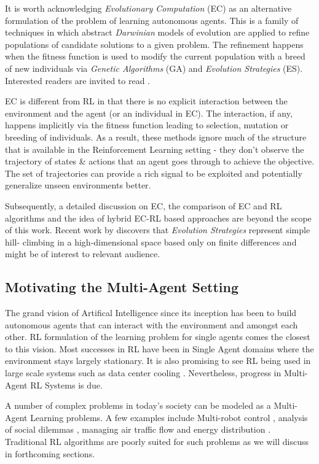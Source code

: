 \documentclass[12pt,a4paper]{article}
\begin{document}
It is worth acknowledging \textit{Evolutionary Computation} (EC) as an alternative formulation
of the problem of learning autonomous agents. This is a family of techniques in which abstract
\textit{Darwinian} models of evolution are applied to refine populations of candidate solutions to
a given problem. The refinement happens when the fitness function is used to modify the
current population with a breed of new individuals via \textit{Genetic Algorithms} (GA) and
\textit{Evolution Strategies} (ES). Interested readers are invited to read \cite{DeJong:2002:EC:1137808}.

EC is different from RL in that there is no explicit interaction between the environment and the
agent (or an individual in EC). The interaction, if any, happens implicitly via the fitness function
leading to selection, mutation or breeding of individuals. As a result, these methods ignore
much of the structure that is available in the Reinforcement Learning setting - they don't
observe the trajectory of states \& actions that an agent goes through to achieve the objective.
The set of trajectories can provide a rich signal to be exploited and potentially generalize 
unseen environments better.

Subsequently, a detailed discussion on EC, the comparison of EC and RL algorithms and the 
idea of hybrid EC-RL based approaches are beyond the scope of this work. Recent work by
\cite{2017arXiv170303864S} discovers that \textit{Evolution Strategies} represent simple hill-
climbing in a high-dimensional space based only on finite differences and might be of interest
to relevant audience.

\subsection{Motivating the Multi-Agent Setting}

The grand vision of Artifical Intelligence since its inception has been to build autonomous
agents that can interact with the environment and amongst each other. RL formulation of the
learning problem for single agents comes the closest to this vision. Most successes in RL
have been in Single Agent domains where the environment stays largely stationary. It is also
promising to see RL being used in large scale systems such as data center cooling 
\cite{deepmind:dccooling}. Nevertheless, progress in Multi-Agent RL Systems is due.

A number of complex problems in today's society can be modeled as a Multi-Agent Learning
problems. A few examples include Multi-robot control \cite{matignon2012coordinated}, 
analysis of social dilemmas \cite{2017arXiv170203037L}, managing air traffic flow
\cite{Agogino:2012:MAM:2124496.2124503} and energy distribution 
\cite{Pipattanasomporn:4840087}. Traditional RL algorithms are poorly suited for such problems
as we will discuss in forthcoming sections.
\end{document}
